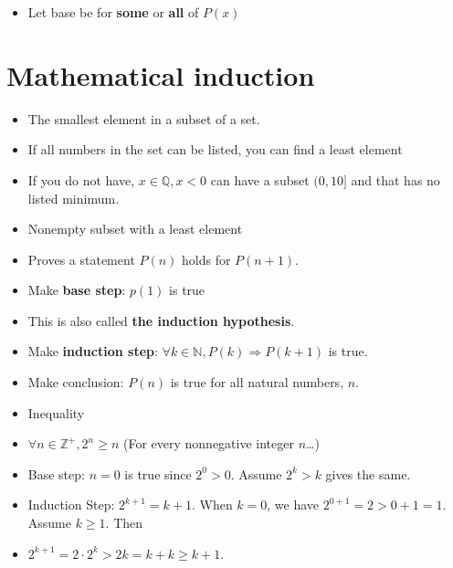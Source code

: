 \documentclass[english,10pt,a4paper]{article}
\begin{document}
\begin{theo} 
\begin{itemize}
\item Let base be for \textbf{some} or \textbf{all} of $P(x)$
\end{itemize}
\end{theo}


\newpage
\section{Mathematical induction}
\begin{theo} 
\begin{itemize}
\item The smallest element in a subset of a set.
\item If all numbers in the set can be listed, you can find a least element
\item If you do not have, $x \in \mathbb{Q}, x < 0$ can have a subset $(0, 10]$ and that has no listed minimum.
\end{itemize}
\end{theo}



\begin{theo} 
\begin{itemize}
\item Nonempty subset with a least element
\end{itemize}
\end{theo}


\begin{theo} 
\begin{itemize}
\item Proves a statement $P(n)$ holds for $P(n+1)$.
\item Make \textbf{base step}: $p(1)$ is true
\item[] This is also called \textbf{the induction hypothesis}.
\item Make \textbf{induction step}: $\forall k \in \mathbb{N}, P(k) \Rightarrow P(k+1)$ is true.
\item Make conclusion: $P(n)$ is true for all natural numbers, $n$.
\end{itemize}
\end{theo}


\begin{theo} 
\begin{itemize}
\item Inequality
\item[] $\forall n \in \mathbb{Z}^+, 2^n \geq n$ (For every nonnegative integer $n$\dots)
\item[] Base step: $n=0$ is true since $2^0>0$. Assume $2^k>k$ gives the same.
\item[] Induction Step: $2^{k+1}=k+1$. When $k=0$, we have $2^{0+1}=2 > 0+1=1$. Assume $k\geq 1$. Then
\item[] $2^{k+1}=2\cdot 2^k > 2k=k+k \geq k+1$.
\end{itemize}
\end{theo}
\end{document}
